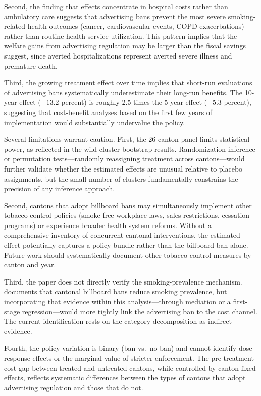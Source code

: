 \documentclass[12pt]{article}
\begin{document}
Second, the finding that effects concentrate in hospital costs rather than ambulatory care suggests that advertising bans prevent the most severe smoking-related health outcomes (cancer, cardiovascular events, COPD exacerbations) rather than routine health service utilization. This pattern implies that the welfare gains from advertising regulation may be larger than the fiscal savings suggest, since averted hospitalizations represent averted severe illness and premature death.

Third, the growing treatment effect over time implies that short-run evaluations of advertising bans systematically underestimate their long-run benefits. The 10-year effect ($-13.2$ percent) is roughly 2.5 times the 5-year effect ($-5.3$ percent), suggesting that cost-benefit analyses based on the first few years of implementation would substantially undervalue the policy.

Several limitations warrant caution. First, the 26-canton panel limits statistical power, as reflected in the wild cluster bootstrap results. Randomization inference or permutation tests---randomly reassigning treatment across cantons---would further validate whether the estimated effects are unusual relative to placebo assignments, but the small number of clusters fundamentally constrains the precision of any inference approach.

Second, cantons that adopt billboard bans may simultaneously implement other tobacco control policies (smoke-free workplace laws, sales restrictions, cessation programs) or experience broader health system reforms. Without a comprehensive inventory of concurrent cantonal interventions, the estimated effect potentially captures a policy bundle rather than the billboard ban alone. Future work should systematically document other tobacco-control measures by canton and year.

Third, the paper does not directly verify the smoking-prevalence mechanism. \citet{stoller2026billboard} documents that cantonal billboard bans reduce smoking prevalence, but incorporating that evidence within this analysis---through mediation or a first-stage regression---would more tightly link the advertising ban to the cost channel. The current identification rests on the category decomposition as indirect evidence.

Fourth, the policy variation is binary (ban vs.\ no ban) and cannot identify dose-response effects or the marginal value of stricter enforcement. The pre-treatment cost gap between treated and untreated cantons, while controlled by canton fixed effects, reflects systematic differences between the types of cantons that adopt advertising regulation and those that do not.
\end{document}
